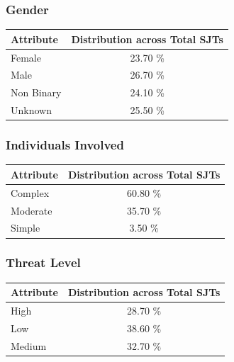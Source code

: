 \documentclass[11pt]{article}
\begin{document}
\subsubsection{Gender}

\begin{table}[H]
\centering
\begin{tabularx}{\columnwidth}{|X|c|}
\hline
\textbf{Attribute} & \textbf{Distribution across Total SJTs} \\
\hline
Female & 23.70 \% \\
\hline
Male & 26.70 \%\\
\hline
Non Binary & 24.10 \%\\
\hline
Unknown & 25.50 \%\\
\hline
\end{tabularx}
\end{table}

\subsubsection{Individuals Involved}

\begin{table}[H]
\centering
\begin{tabularx}{\columnwidth}{|X|c|}
\hline
\textbf{Attribute} & \textbf{Distribution across Total SJTs} \\
\hline
Complex & 60.80 \% \\
\hline
Moderate & 35.70 \%\\
\hline
Simple & 3.50 \%\\
\hline
\end{tabularx}
\end{table}

\subsubsection{Threat Level}

\begin{table}[H]
\centering
\begin{tabularx}{\columnwidth}{|X|c|}
\hline
\textbf{Attribute} & \textbf{Distribution across Total SJTs} \\
\hline
High & 28.70 \% \\
\hline
Low & 38.60 \%\\
\hline
Medium & 32.70 \%\\
\hline
\end{tabularx}
\end{table}
\end{document}
